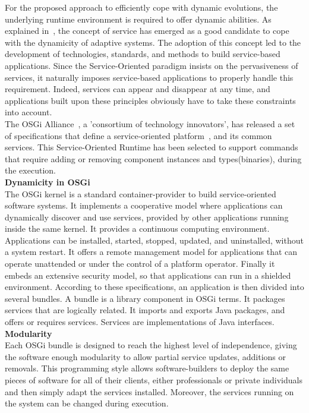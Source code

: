 For the proposed approach to efficiently cope with dynamic evolutions, the underlying runtime environment is required to offer dynamic abilities. As explained in~\cite{Di-Nitto:2008}, the concept of service has emerged as a good candidate to cope with the dynamicity of adaptive systems. The adoption of this concept led to the development of technologies, standards, and methods to build service-based applications. Since the Service-Oriented paradigm insists on the pervasiveness of services, it naturally imposes service-based applications to properly handle this requirement. Indeed, services can appear and disappear at any time, and applications built upon these principles obviously have to take these constraints into account.\\

The OSGi Alliance~\cite{OSGI:r4}, a 'consortium of technology innovators', has released a set of specifications that define a service-oriented platform~\cite{OSGI:r4}, and its common services. This Service-Oriented Runtime has been selected to support commands that require adding or removing component instances and types(binaries), during the execution.\\

{\bf Dynamicity in OSGi}\\
The OSGi kernel is a standard container-provider to build service-oriented software systems. It implements a cooperative model where applications can dynamically discover and use services, provided by other applications running inside the same kernel. It provides a continuous computing environment. Applications can be installed, started, stopped, updated, and uninstalled, without a system restart. It offers a remote management model for applications that can operate unattended or under the control of a platform operator. Finally it embeds an extensive security model, so that applications can run in a shielded environment. According to these specifications, an application is then divided into several bundles. A bundle is a library component in OSGi terms. It packages services that are logically related. It imports and exports Java packages, and offers or requires services. Services are implementations of Java interfaces.\\

{\bf Modularity}\\
Each OSGi bundle is designed to reach the highest level of independence, giving the software enough modularity to allow partial service updates, additions or removals. This programming style allows software-builders to deploy the same pieces of software for all of their clients, either professionals or private individuals and then simply adapt the services installed. Moreover, the services running on the system can be changed during execution.\\


